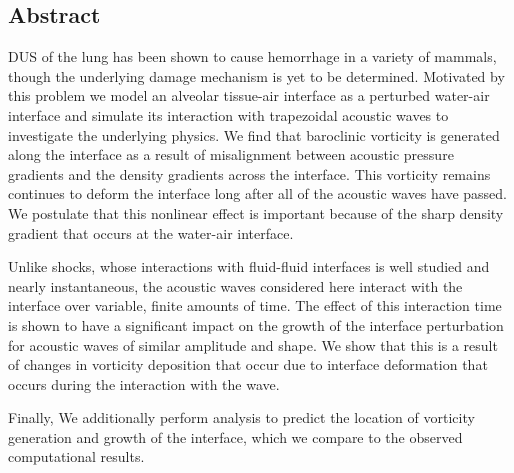 \begin{center}
  \begin{minipage}{0.8\textwidth}
    \subsection*{Abstract}
    \ac{DUS} of the lung has been shown to cause hemorrhage in a
    variety of mammals, though the underlying damage mechanism is yet
    to be determined. Motivated by this problem we model an alveolar
    tissue-air interface as a perturbed water-air interface and
    simulate its interaction with trapezoidal acoustic waves to
    investigate the underlying physics. We find that baroclinic
    vorticity is generated along the interface as a result of
    misalignment between acoustic pressure gradients and the density
    gradients across the interface. This vorticity remains continues
    to deform the interface long after all of the acoustic waves have
    passed. We postulate that this nonlinear effect is important
    because of the sharp density gradient that occurs at the water-air
    interface.

    Unlike shocks, whose interactions with fluid-fluid
    interfaces is well studied and nearly instantaneous, the acoustic
    waves considered here interact with the interface over variable,
    finite amounts of time. The effect of this interaction time is
    shown to have a significant impact on the growth of the interface
    perturbation for acoustic waves of similar amplitude and shape. We
    show that this is a result of changes in vorticity deposition that
    occur due to interface deformation that occurs during the
    interaction with the wave.

    Finally, We additionally perform analysis to predict the location
    of vorticity generation and growth of the interface, which we
    compare to the observed computational results.
  \end{minipage}
\end{center}
